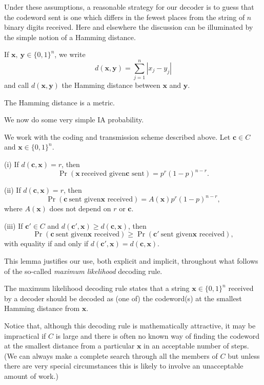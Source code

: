 Under these
assumptions, a reasonable strategy for our decoder
is to guess
that the codeword sent is one which differs
in the fewest places from the string of $n$
binary digits received. Here and elsewhere
the discussion can be illuminated by the
simple notion of a Hamming distance.
\begin{definition} If $\mathbf{x},\ \mathbf{y}\in \{0,1\}^{n}$,
we write
\[d(\mathbf{x},\mathbf{y})=\sum_{j=1}^{n}|x_{j}-y_{j}|\]
and call $d(\mathbf{x},\mathbf{y})$ the Hamming distance between
$\mathbf{x}$ and $\mathbf{y}$.
\end{definition}
\begin{lemma} The Hamming distance is a metric.
\end{lemma}
We now do some very simple IA probability.
\begin{lemma} We work with the coding and transmission scheme
described above.
Let ${\mathbf c}\in C$ and ${\mathbf x}\in \{0,1\}^{n}$.

(i) If $d({\mathbf c},{\mathbf x})=r$, then
\[\Pr({\mathbf x}\ \text{received given
${\mathbf c}$ sent})=p^{r}(1-p)^{n-r}.\]

(ii)  If
$d({\mathbf c},{\mathbf x})=r$, then
\[\Pr({\mathbf c}\ \text{sent given
${\mathbf x}$ received})=A({\mathbf x})p^{r}(1-p)^{n-r},\]
where $A({\mathbf x})$ does not depend on $r$ or ${\mathbf c}$.

(iii) If ${\mathbf c}'\in C$  and
$d({\mathbf c}',{\mathbf x})\geq d({\mathbf c},{\mathbf x})$,
then
\[\Pr({\mathbf c}\ \text{sent given
${\mathbf x}$ received})\geq
\Pr({\mathbf c}'\ \text{sent given
${\mathbf x}$ received}),\]
with equality if and only if
$d({\mathbf c}',{\mathbf x})=d({\mathbf c},{\mathbf x})$.
\end{lemma}
This lemma justifies our use, both explicit
and implicit, throughout what follows of the so-called
\emph{maximum likelihood} decoding rule.
\begin{definition} The maximum likelihood decoding
rule states that a string ${\mathbf x}\in \{0,1\}^{n}$
received by a decoder should be decoded as
(one of) the codeword(s) at the smallest
Hamming distance from ${\mathbf x}$.
\end{definition}
Notice that, although this decoding rule is mathematically
attractive, it may be impractical if $C$ is large
and there is often no known way of finding the codeword at
the smallest distance from a particular ${\mathbf x}$
in an acceptable number of steps.
(We can always make a complete search through all the
members of $C$ but unless there are very special circumstances
this is likely to involve an unacceptable amount of work.)


